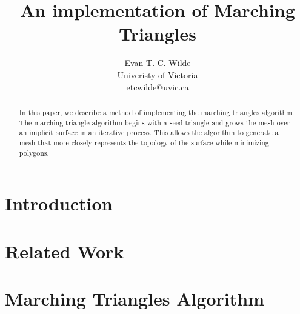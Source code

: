 \documentclass[conference]{acmsiggraph}
\title{An implementation of Marching Triangles}
\author{
	Evan T. C. Wilde \\
	Univeristy of Victoria\\
	etcwilde@uvic.ca
}
\begin{document}


\maketitle

\begin{abstract}
	In this paper, we describe a method of implementing the marching
	triangles algorithm. The marching triangle algorithm begins with a
	seed triangle and grows the mesh over an implicit surface in an
	iterative process. This allows the algorithm to generate a mesh that
	more closely represents the topology of the surface while minimizing
	polygons.
\end{abstract}

\keywordlist

\copyrightspace

\section{Introduction}

\section{Related Work}

\section{Marching Triangles Algorithm}
\end{document}
